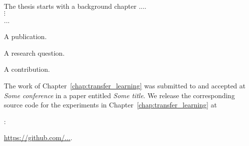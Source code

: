 \label{chap:introduction}

\label{sec:overview}

The thesis starts with a background chapter ....
\vspace{7pt}\\
$\vdots$\\
...

\vspace{5pt}
\noindent\begin{publicationinfo}
	A publication.
\end{publicationinfo}

\vspace{5pt}
\noindent\begin{researchquestions}
	A research question.
\end{researchquestions}

\vspace{5pt}
\noindent\begin{contributionninfo}
	A contribution.
\end{contributionninfo}

\label{sec:code_and_publications}

The work of Chapter~\ref{chap:transfer_learning} was submitted to and accepted at \textit{Some conference} in a paper entitled \textit{Some title}.
We release the corresponding source code for the experiments in Chapter~\ref{chap:transfer_learning} at {:\par \centering \url{https://github.com/...}. \par\vspace{0.5em}} 
